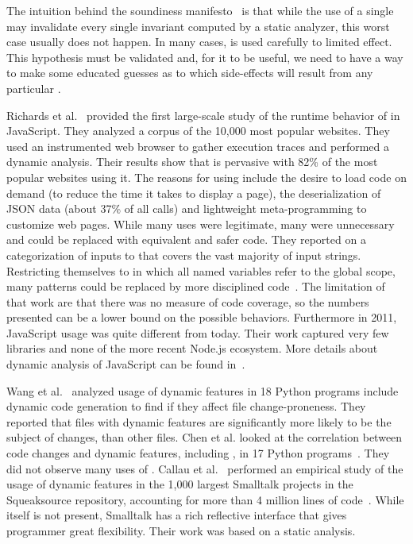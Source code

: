 \documentclass[USenglish,cleveref, autoref, thm-restate]{lipics-v2019}
\begin{document}
The intuition behind the soundiness manifesto~\cite{soundy} is that while
the use of a single \eval may invalidate every single invariant computed by
a static analyzer, this worst case usually does not happen.  In many cases,
\eval is used carefully to limited effect. This hypothesis must be validated
and, for it to be useful, we need to have a way to make some educated
guesses as to which side-effects will result from any particular \eval.

Richards et al.~\cite{ecoop11} provided the first large-scale study of the
runtime behavior of \eval in JavaScript. They analyzed a corpus of the
10,000 most popular websites. They used an instrumented web browser to
gather execution traces and performed a dynamic analysis.  Their results show
that \eval is pervasive with 82\% of the most popular websites using it. The
reasons for using \eval include the desire to load code on demand (to reduce
the time it takes to display a page), the deserialization of JSON data
(about 37\% of all calls) and lightweight meta-programming to customize web
pages.  While many uses \eval were legitimate, many were unnecessary and
could be replaced with equivalent and safer code.  They reported on a
categorization of inputs to \eval that covers the vast majority of input
strings.  Restricting themselves to \eval in which all named variables refer
to the global scope, many patterns could be replaced by more disciplined
code~\cite{oopsla12b}.  The limitation of that work are that there was no
measure of code coverage, so the numbers presented can be a lower bound on
the possible behaviors.  Furthermore in 2011, JavaScript usage was quite
different from today. Their work captured very few libraries and none of the
more recent Node.js ecosystem.  More details about dynamic analysis of
JavaScript can be found in~\cite{liang}.

Wang et al.~\cite{wang} analyzed usage of dynamic features in 18 Python
programs include dynamic code generation to find if they affect file
change-proneness.  They reported that files with dynamic features are
significantly more likely to be the subject of changes, than other files.
Chen et al. looked at the correlation between code changes and dynamic
features, including \eval, in 17 Python programs~\cite{chen}. They did not
observe many uses of \eval.  Callau et al.~\cite{oscar} performed an empirical study of
the usage of dynamic features in the 1,000 largest Smalltalk projects in the
Squeaksource repository, accounting for more than 4 million lines of
code~\cite{oscar}. While \eval itself is not present, Smalltalk has a rich
reflective interface that gives programmer great flexibility. Their work was
based on a static analysis.
\end{document}
